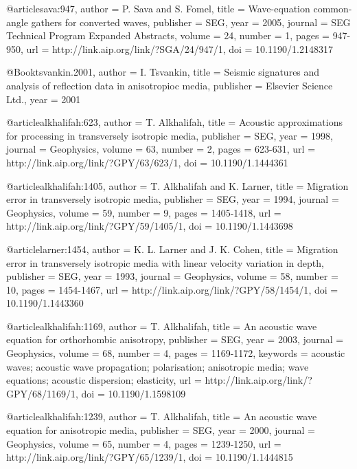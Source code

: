 {@article{sava:947,
  author =	 {P. Sava and S. Fomel},
  title =	 {Wave-equation common-angle gathers for converted
                  waves},
  publisher =	 {SEG},
  year =	 2005,
  journal =	 {SEG Technical Program Expanded Abstracts},
  volume =	 24,
  number =	 1,
  pages =	 {947-950},
  url =		 {http://link.aip.org/link/?SGA/24/947/1},
  doi =		 {10.1190/1.2148317}
}

@Book{tsvankin.2001,
  author =	 {I. Tsvankin},
  title =	 {Seismic signatures and analysis of reflection data
                  in anisotropioc media},
  publisher =	 {Elsevier Science Ltd.},
  year =	 2001
}

@article{alkhalifah:623,
  author =	 {T. Alkhalifah},
  title =	 {Acoustic approximations for processing in
                  transversely isotropic media},
  publisher =	 {SEG},
  year =	 1998,
  journal =	 {Geophysics},
  volume =	 63,
  number =	 2,
  pages =	 {623-631},
  url =		 {http://link.aip.org/link/?GPY/63/623/1},
  doi =		 {10.1190/1.1444361}
}

@article{alkhalifah:1405,
  author =	 {T. Alkhalifah and K. Larner},
  title =	 {Migration error in transversely isotropic media},
  publisher =	 {SEG},
  year =	 1994,
  journal =	 {Geophysics},
  volume =	 59,
  number =	 9,
  pages =	 {1405-1418},
  url =		 {http://link.aip.org/link/?GPY/59/1405/1},
  doi =		 {10.1190/1.1443698}
}

@article{larner:1454,
  author =	 {K. L. Larner and J. K. Cohen},
  title =	 {Migration error in transversely isotropic media with
                  linear velocity variation in depth},
  publisher =	 {SEG},
  year =	 1993,
  journal =	 {Geophysics},
  volume =	 58,
  number =	 10,
  pages =	 {1454-1467},
  url =		 {http://link.aip.org/link/?GPY/58/1454/1},
  doi =		 {10.1190/1.1443360}
}

@article{alkhalifah:1169,
  author =	 {T. Alkhalifah},
  title =	 {An acoustic wave equation for orthorhombic
                  anisotropy},
  publisher =	 {SEG},
  year =	 2003,
  journal =	 {Geophysics},
  volume =	 68,
  number =	 4,
  pages =	 {1169-1172},
  keywords =	 {acoustic waves; acoustic wave propagation;
                  polarisation; anisotropic media; wave equations;
                  acoustic dispersion; elasticity},
  url =		 {http://link.aip.org/link/?GPY/68/1169/1},
  doi =		 {10.1190/1.1598109}
}

@article{alkhalifah:1239,
  author =	 {T. Alkhalifah},
  title =	 {An acoustic wave equation for anisotropic media},
  publisher =	 {SEG},
  year =	 2000,
  journal =	 {Geophysics},
  volume =	 65,
  number =	 4,
  pages =	 {1239-1250},
  url =		 {http://link.aip.org/link/?GPY/65/1239/1},
  doi =		 {10.1190/1.1444815}
}

}
